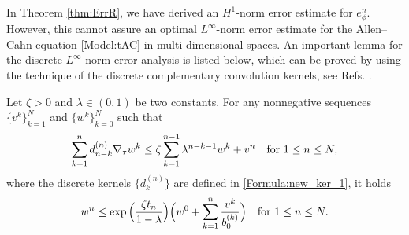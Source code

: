 \documentclass{m2an}
\begin{document}
In Theorem \ref{thm:ErrR}, we have derived an $ H^{1} $-norm  error estimate for $ e_{\phi}^{n} $. However, this cannot assure an optimal $L^{\infty}$-norm error estimate for the Allen--Cahn equation \eqref{Model:tAC} in multi-dimensional spaces. An important lemma for the discrete $ L^{\infty}$-norm error analysis is listed below, which can be proved by using the technique of the discrete complementary convolution kernels, see Refs. \cite{MOC_2023_Ju,SINUM_2020_Liao}.

\begin{lmm}\label{lem:Gron}
	Let $\zeta>0$ and $\lambda \in(0,1)$ be two constants. For any nonnegative sequences $\{v^k\}_{k=1}^N$ and $\{w^k\}_{k=0}^N$ such that
	$$
	\sum_{k=1}^n d_{n-k}^{(n)} \nabla_\tau w^k \leq \zeta \sum_{k=1}^{n-1} \lambda^{n-k-1} w^k + v^n \quad {\rm for } \  1 \leq n \leq N,
	$$
	where the discrete kernels $\{d_k^{(n)}\}$ are defined in \eqref{Formula:new_ker_1}, it holds
	$$
	w^n \leq \exp \Big(\frac{\zeta t_n}{1-\lambda}\Big)\Big(w^0+\sum_{k=1}^n \frac{v^k}{b_0^{(k)}}\Big) \quad {\rm for } \  1 \leq n \leq N .
	$$
\end{lmm}
\end{document}
